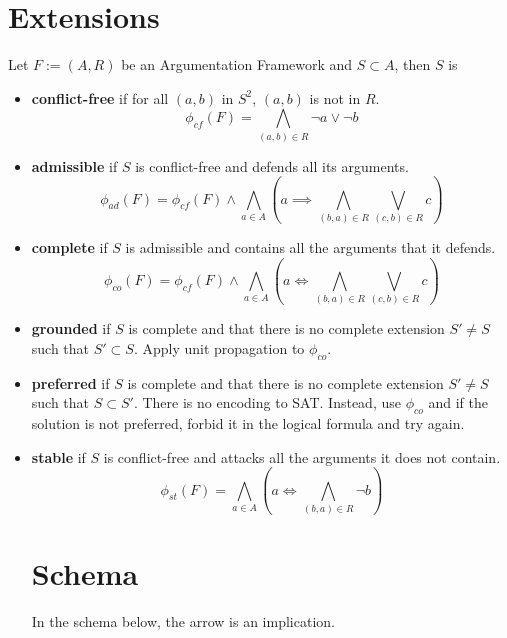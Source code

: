 \documentclass[11pt]{article}
\begin{document}
\section{Extensions}
Let $F := (A, R)$ be an Argumentation Framework and $S \subset A$, then $S$ is
\begin{itemize}

\item \textbf{conflict-free} if for all $(a, b)$ in $S^2$, $(a, b)$ is not in $R$.
$$
\phi_{cf}(F) = \bigwedge_{(a, b) \in R} \lnot a \lor \lnot b
$$
\item \textbf{admissible} if $S$ is conflict-free and defends all its arguments.
$$
\phi_{ad}(F) = \phi_{cf}(F) \land \bigwedge_{a \in A} \left( a \implies \bigwedge_{(b, a) \in R} \bigvee_{(c, b) \in R} c \right)
$$
\item \textbf{complete} if $S$ is admissible and contains all the arguments that it defends.
$$
\phi_{co}(F) = \phi_{cf}(F) \land \bigwedge_{a \in A} \left( a \iff \bigwedge_{(b, a) \in R} \bigvee_{(c, b) \in R} c \right)
$$
\item \textbf{grounded} if $S$ is complete and that there is no complete extension $S' \neq S$ such that $S' \subset S$.
Apply unit propagation to $\phi_{co}$.
\item \textbf{preferred} if $S$ is complete and that there is no complete extension $S' \neq S$ such that $S \subset S'$.
There is no encoding to SAT. Instead, use $\phi_{co}$ and if the solution is not preferred, forbid it in the logical formula and try again.
\item \textbf{stable} if $S$ is conflict-free and attacks all the arguments it does not contain.
$$
\phi_{st}(F) = \bigwedge_{a \in A}\left(a \iff \bigwedge_{(b, a)\in R} \lnot b\right)
$$

\newpage
\section{Schema}
In the schema below, the arrow is an implication. \\ \\

\end{itemize}
\end{document}
